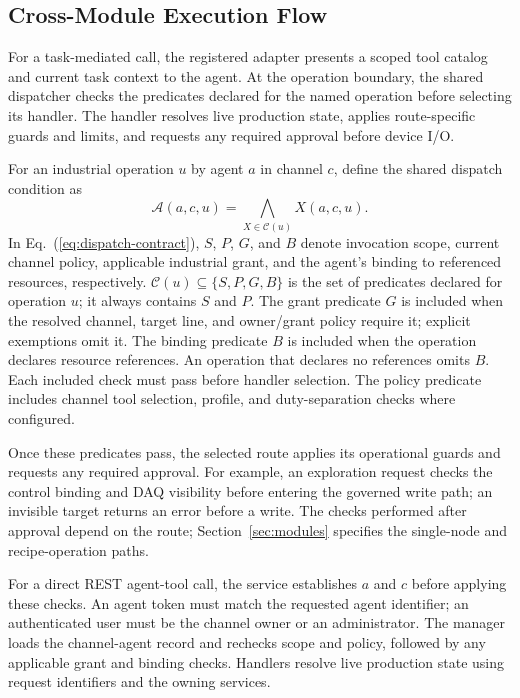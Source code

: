 \subsection{Cross-Module Execution Flow}
\label{sec:executionflow}
For a task-mediated call, the registered adapter presents a scoped tool
catalog and current task context to the agent. At the operation boundary, the
shared dispatcher checks the predicates declared for the named operation
before selecting its handler. The handler resolves live production state,
applies route-specific guards and limits, and requests any required approval
before device I/O.

For an industrial operation $u$ by agent $a$ in channel $c$, define the
shared dispatch condition as
\begin{equation}
\mathcal{A}(a,c,u)=\bigwedge_{X\in\mathcal{C}(u)}X(a,c,u).
\label{eq:dispatch-contract}
\end{equation}
In Eq.~(\ref{eq:dispatch-contract}), $S$, $P$, $G$, and $B$ denote invocation scope, current channel policy,
applicable industrial grant, and the agent's binding to referenced resources,
respectively. $\mathcal{C}(u)\subseteq\{S,P,G,B\}$ is the set of predicates
declared for operation $u$; it always contains $S$ and $P$. The grant predicate
$G$ is included when the resolved channel, target line, and owner/grant policy
require it; explicit exemptions omit it. The binding predicate $B$ is included
when the operation declares resource references. An operation that declares
no references omits $B$. Each included check must pass before handler
selection. The policy predicate includes channel tool selection, profile, and duty-separation checks where
configured.

Once these predicates pass, the selected route applies its operational
guards and requests any required approval. For example, an exploration request checks
the control binding and DAQ visibility before entering the governed write
path; an invisible target returns an error before a write. The checks performed
after approval depend on the route; Section~\ref{sec:modules} specifies the
single-node and recipe-operation paths.

For a direct REST agent-tool call, the service establishes $a$ and $c$ before applying
these checks. An agent token must match the requested agent identifier; an
authenticated user must be the channel owner or an administrator. The manager
loads the channel-agent record and rechecks scope and policy, followed by any
applicable grant and binding checks. Handlers resolve live production state
using request identifiers and the owning services.


